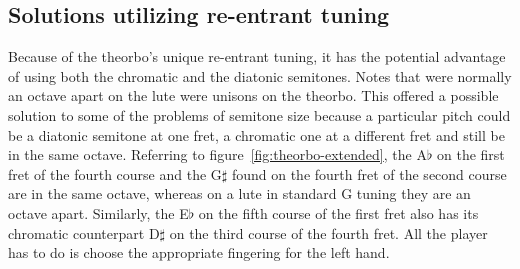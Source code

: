 \subsection{Solutions utilizing re-entrant tuning}

Because of the theorbo's unique re-entrant tuning, it has the potential advantage of using
both the chromatic and the diatonic semitones.  Notes that were normally an octave
apart on the lute were unisons on the theorbo.  This offered a possible solution to some
of the problems of semitone size because a particular pitch could be a diatonic semitone
at one fret, a chromatic one at a different fret and still be in the same octave. Referring
to figure~\ref{fig:theorbo-extended}, the A$\flat$ on the first fret of the fourth course
and the G$\sharp$ found on the fourth fret of the second course are in the same octave,
whereas on a lute in standard G tuning they are an octave apart. Similarly, the E$\flat$
on the fifth course of the first fret also has its chromatic counterpart D$\sharp$ on the
third course of the fourth fret.  All the player has to do is choose the appropriate
fingering for the left hand.

